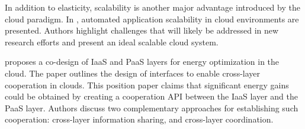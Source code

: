 
In addition to elasticity, scalability is another major advantage introduced by the cloud paradigm.
In \cite{vaquero_dynamically_2011}, automated application scalability in cloud environments are presented.
Authors highlight challenges that will likely be addressed in new research efforts and present an ideal scalable cloud system.


\cite{carpen-amarie_towards_2014} proposes a co-design of IaaS and PaaS layers for energy optimization in the cloud. The paper outlines the design of interfaces to enable cross-layer cooperation in clouds. This position paper claims that significant energy gains could be obtained by creating a cooperation API between the IaaS layer and the PaaS layer. Authors discuss two complementary approaches for establishing such cooperation: cross-layer information sharing, and cross-layer coordination.





